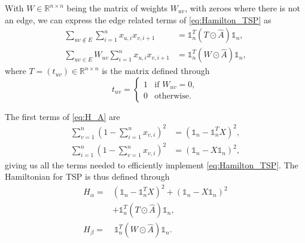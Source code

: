 With $W \in \mathbb{R}^{n \times n}$ being the matrix of weights $W_{uv}$, with zeroes where there is not an edge, we can express the edge related terms of \eqref{eq:Hamilton_TSP} as
\begin{equation}
\begin{split}
    \sum_{uv \notin E}\sum_{i = 1}^n x_{u,i}x_{v,i+1} &= \mathds{1}_n^T \left( T \odot \hat{A} \right) \mathds{1}_n, \\
    \sum_{uv \in E} W_{uv} \sum_{i = 1}^n x_{u,i}x_{v,i+1} &= \mathds{1}_n^T \left( W \odot \hat{A} \right) \mathds{1}_n,
\end{split}
\end{equation}
where $T = (t_{uv}) \in \mathbb{R}^{n \times n}$ is the matrix defined through
\begin{equation}
    t_{uv} =
    \begin{cases}
        1 & \text{if } W_{uv} = 0, \\
        0 & \text{otherwise}.
    \end{cases}
\end{equation}

The first terms of \eqref{eq:H_A} are
\begin{equation}
\begin{split}
    \sum_{v = 1}^n \left( 1 - \sum_{i = 1}^n x_{v,i} \right)^2 &= \left( \mathds{1}_n - \mathds{1}_n^T X \right)^2, \\
    \sum_{i = 1}^n \left( 1 - \sum_{v = 1}^n x_{v,i} \right)^2 &= \left( \mathds{1}_n - X\mathds{1}_n \right)^2,
\end{split}
\end{equation}
giving us all the terms needed to efficiently implement \eqref{eq:Hamilton_TSP}. The Hamiltonian for TSP is thus defined through
\begin{equation}
\begin{split}
    H_{\alpha} =&  \left( \mathds{1}_n - \mathds{1}_n^T X \right)^2 + \left( \mathds{1}_n - X\mathds{1}_n \right)^2 \\
    &+ \mathds{1}_n^T \left( T \odot \hat{A} \right)\mathds{1}_n, \\
    H_{\beta} =& \ \mathds{1}_n^T \left( W \odot \hat{A} \right) \mathds{1}_n.
\end{split}
\end{equation}


